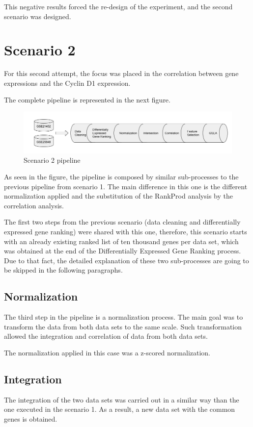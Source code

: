 This negative results forced the re-design of the experiment, and the second scenario was designed.

\newpage
\section{Scenario 2}

For this second attempt, the focus was placed in the correlation between gene expressions and the Cyclin D1 expression.

The complete pipeline is represented in the next figure.

\begin{figure}[h]
    \centering
    \includegraphics[scale=0.5]{../figs/scenario_2_figure.png}
    \caption{Scenario 2 pipeline}
    \label{fig:scenario-2}
\end{figure}

As seen in the figure, the pipeline is composed by similar sub-processes to the previous pipeline from scenario 1. The main difference in this one is the different normalization applied and the substitution of the RankProd analysis by the correlation analysis.

The first two steps from the previous scenario (data cleaning and differentially expressed gene ranking) were shared with this one, therefore, this scenario starts with an already existing ranked list of ten thousand genes per data set, which was obtained at the end of the Differentially Expressed Gene Ranking process. Due to that fact, the detailed explanation of these two sub-processes are going to be skipped in the following paragraphs.


\subsection{Normalization}
The third step in the pipeline is a normalization process. The main goal was to transform the data from both data sets to the same scale.
Such transformation allowed the integration and correlation of data from both data sets.

The normalization applied in this case was a z-scored normalization.

\subsection{Integration}
The integration of the two data sets was carried out in a similar way than the one executed in the scenario 1.
As a result, a new data set with the common genes is obtained.

